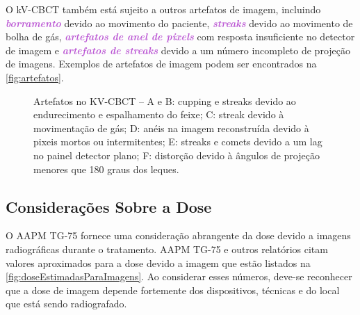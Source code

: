 \documentclass[11pt,a4paper]{article}
\begin{document}
    O kV-CBCT também está sujeito a outros artefatos de imagem, incluindo \textcolor{MediumOrchid}{\textbf{\textit{borramento}}} devido ao movimento do paciente, \textcolor{MediumOrchid}{\textbf{\textit{streaks}}} devido ao movimento de bolha de gás, \textcolor{MediumOrchid}{\textbf{\textit{artefatos de anel de pixels}}} com resposta insuficiente no detector de imagem e \textcolor{MediumOrchid}{\textbf{\textit{artefatos de streaks}}} devido a um número incompleto de projeção de imagens. Exemplos de artefatos de imagem podem ser encontrados na \ref{fig:artefatos}.

    \begin{figure}[h]
        \centering
        \caption{Artefatos no KV-CBCT -- A e B: cupping e streaks devido ao endurecimento e espalhamento do feixe; C: streak devido à movimentação de gás; D: anéis na imagem reconstruída devido à pixeis mortos ou intermitentes; E: streaks e comets devido a um lag no painel detector plano; F: distorção devido à ângulos de projeção menores que 180 graus dos leques.}
        \label{fig:artefatosartefatos}
    \end{figure}

\subsection*{Considerações Sobre a Dose}

    O AAPM TG-75 fornece uma consideração abrangente da dose devido a imagens radiográficas durante o tratamento. AAPM TG-75 e outros relatórios citam valores aproximados para a dose devido a imagem que estão listados na \ref{fig:doseEstimadasParaImagens}. Ao considerar esses números, deve-se reconhecer que a dose de imagem depende fortemente dos dispositivos, técnicas e do local que está sendo radiografado.
\end{document}
